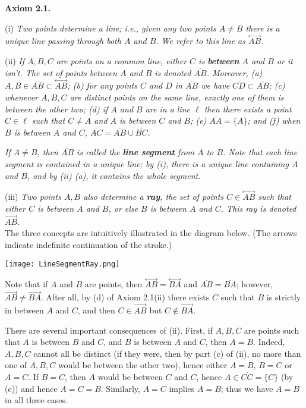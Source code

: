 \documentclass[leqno]{book}
\begin{document}
\noindent\textbf{Axiom 2.1.}

(i) \emph{Two points determine a line; i.e., given any two points $A\ne B$ there is a unique line passing through both $A$ and $B$.  We refer to this line as $\overset{\longleftrightarrow}{AB}$.}

(ii) \emph{If $A,B,C$ are points on a common line, either $C$ is \textbf{between} $A$ and $B$ or it isn't.  The set of points between $A$ and $B$ is denoted $\overline{AB}$.  Moreover, (a) $A,B\in\overline{AB}\subset\overset{\longleftrightarrow}{AB}$; (b) for any points $C$ and $D$ in $\overline{AB}$ we have $\overline{CD}\subset\overline{AB}$; (c) whenever $A,B,C$ are distinct points on the same line, exactly one of them is between the other two; (d) if $A$ and $B$ are in a line $\ell$ then there exists a point $C\in\ell$ such that $C\ne A$ and $A$ is between $C$ and $B$; (e) $\overline{AA}=\{A\}$; and (f) when $B$ is between $A$ and $C$, $\overline{AC}=\overline{AB}\cup\overline{BC}$.}

\emph{If $A\ne B$, then $\overline{AB}$ is called the \textbf{line segment} from $A$ to $B$.  Note that each line segment is contained in a unique line; by (i), there is a unique line containing $A$ and $B$, and by (ii) (a), it contains the whole segment.}

(iii) \emph{Two points $A,B$ also determine a \textbf{ray}, the set of points $C\in\overset{\longleftrightarrow}{AB}$ such that either $C$ is between $A$ and $B$, or else $B$ is between $A$ and $C$.  This ray is denoted $\overset{\longrightarrow}{AB}$.}\\

\noindent The three concepts are intuitively illustrated in the diagram below.  (The arrows indicate indefinite continuation of the stroke.)
\begin{center}\texttt{[image: LineSegmentRay.png]}\end{center} %
Note that if $A$ and $B$ are points, then $\overset{\longleftrightarrow}{AB}=\overset{\longleftrightarrow}{BA}$ and $\overline{AB}=\overline{BA}$; however, $\overset{\longrightarrow}{AB}\ne\overset{\longrightarrow}{BA}$.  After all, by (d) of Axiom 2.1(ii) there exists $C$ such that $B$ is strictly in between $A$ and $C$, and then $C\in\overset{\longrightarrow}{AB}$ but $C\notin\overset{\longrightarrow}{BA}$.

There are several important consequences of (ii).  First, if $A,B,C$ are points such that $A$ is between $B$ and $C$, and $B$ is between $A$ and $C$, then $A=B$.  Indeed, $A,B,C$ cannot all be distinct (if they were, then by part (c) of (ii), no more than one of $A,B,C$ would be between the other two), hence either $A=B$, $B=C$ or $A=C$.  If $B=C$, then $A$ would be between $C$ and $C$, hence $A\in\overline{CC}=\{C\}$ (by (e)) and hence $A=C=B$.  Similarly, $A=C$ implies $A=B$; thus we have $A=B$ in all three cases.
\end{document}
